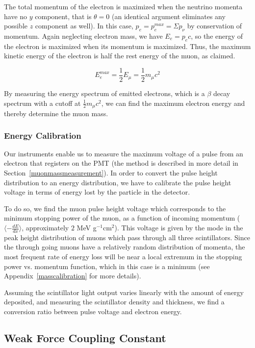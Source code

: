 The total momentum of the electron is maximized when the neutrino
momenta have no $y$ component, that is $\theta = 0$ (an identical argument
eliminates any possible $z$ component as well). In this case,
$p_e = p_e^{max} = \Sigma p_{\nu}$ by conservation of momentum. Again
neglecting electron mass, we have $E_e = p_ec$, so the energy of the
electron is maximized when its momentum is maximized. Thus, the
maximum kinetic energy of the electron is half the rest energy of the
muon, as claimed.

\begin{equation}E_e^{max} = \frac{1}{2}E_{\mu} = \frac{1}{2}m_{\mu}c^2\end{equation}

By measuring the energy spectrum of emitted electrons, which is a
$\beta$ decay spectrum with a cutoff at $\frac{1}{2}m_{\mu}c^2$, we
can find the maximum electron energy and thereby determine the muon
mass.

\subsubsection{Energy Calibration}\label{energycalibration}

Our instruments enable us to measure the maximum voltage of a pulse
from an electron that registers on the PMT (the method is described in
more detail in Section~\ref{muonmassmeasurement}). In order to convert
the pulse height distribution to an energy distribution, we have to
calibrate the pulse height voltage in terms of energy lost by the
particle in the detector.

To do so, we find the muon pulse height voltage which corresponds to
the minimum stopping power of the muon, as a function of incoming momentum ($\langle -\frac{dE}{dx}\rangle$, approximately $2$ MeV
g$^{-1}$cm$^{2}$). This voltage is given by the mode in the peak
height distribution of muons which pass through all three
scintillators. Since the through going muons have a relatively random
distribution of momenta, the most frequent rate of energy loss will be
near a local extremum in the stopping power vs. momentum function,
which in this case is a minimum (see Appendix~\ref{masscalibration}
for more details).

Assuming the scintillator light output varies linearly with the amount
of energy deposited, and measuring the scintillator density and
thickness, we find a conversion ratio between pulse voltage and
electron energy.

\subsection{Weak Force Coupling Constant}

